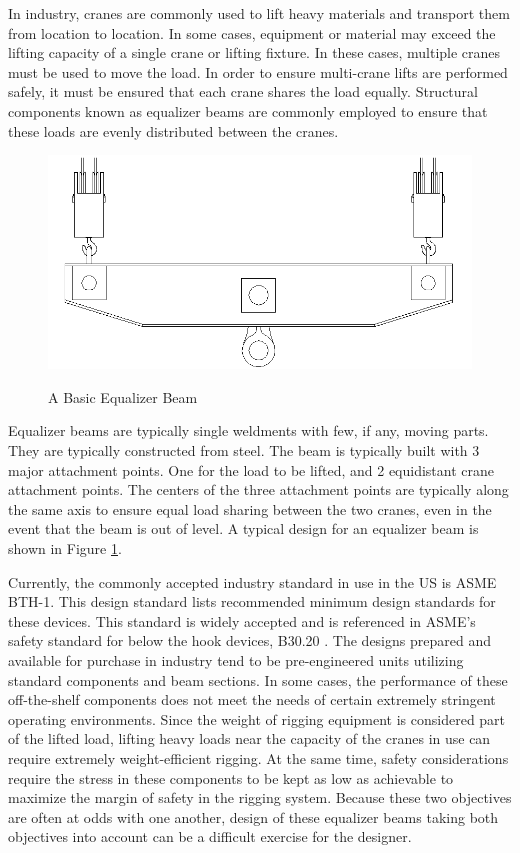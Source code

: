 
In industry, cranes are commonly used to lift heavy materials and transport them from location to location. In some cases, equipment or material may exceed the lifting capacity of a single crane or lifting fixture. In these cases, multiple cranes must be used to move the load. In order to ensure multi-crane lifts are performed safely, it must be ensured that each crane shares the load equally. Structural components known as equalizer beams are commonly employed to ensure that these loads are evenly distributed between the cranes. 


\begin{figure}
\includegraphics[width=\textwidth]{img/basic_eq_beam.png}
\label{img:basic_beam}
\caption{A Basic Equalizer Beam}
\end{figure}

Equalizer beams are typically single weldments with few, if any, moving parts. They are typically constructed from steel. The beam is typically built with 3 major attachment points. One for the load to be lifted, and 2 equidistant crane attachment points. The centers of the three attachment points are typically along the same axis to ensure equal load sharing between the two cranes, even in the event that the beam is out of level. A typical design for an equalizer beam is shown in Figure \ref{img:basic_beam}. 

Currently, the commonly accepted industry standard in use in the US is ASME BTH-1\cite{asme-bth-1}. This design standard lists recommended minimum design standards for these devices. This standard is widely accepted and is referenced in ASME's safety standard for below the hook devices, B30.20 \cite{asme-b30-20}. The designs prepared and available for purchase in industry tend to be pre-engineered units utilizing standard components and beam sections. In some cases, the performance of these off-the-shelf components does not meet the needs of certain extremely stringent operating environments. Since the weight of rigging equipment is considered part of the lifted load, lifting heavy loads near the capacity of the cranes in use can require extremely weight-efficient rigging. At the same time, safety considerations require the stress in these components to be kept as low as achievable to maximize the margin of safety in the rigging system. Because these two objectives are often at odds with one another, design of these equalizer beams taking both objectives into account can be a difficult exercise for the designer. 

